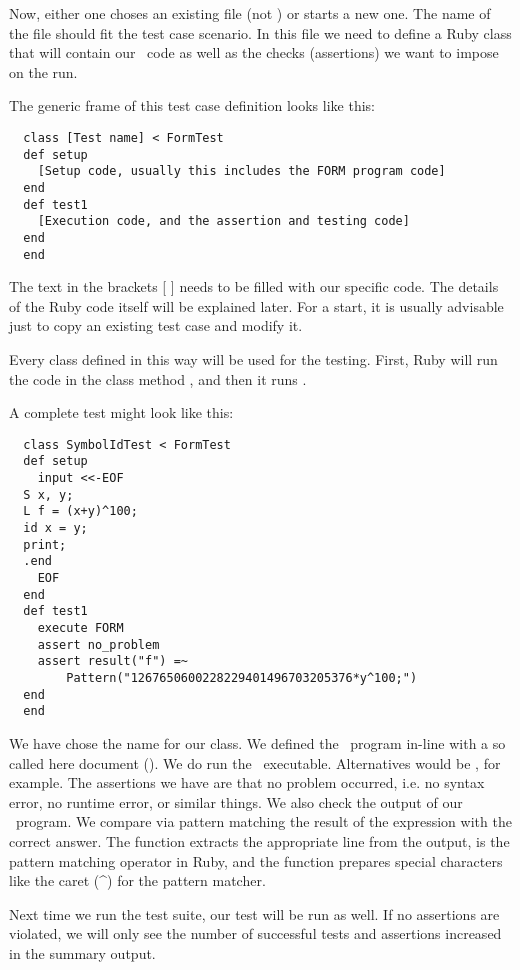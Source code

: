 Now, either one choses an existing  file (not ) or starts a
new one. The name of the file should fit the test case scenario. In this file we
need to define a Ruby class that will contain our \FORM\ code as well as the
checks (assertions) we want to impose on the run.

The generic frame of this test case definition looks like this:

\begin{verbatim}
  class [Test name] < FormTest
  def setup
    [Setup code, usually this includes the FORM program code]
  end
  def test1
    [Execution code, and the assertion and testing code]
  end
  end
\end{verbatim}

The text in the brackets [ ] needs to be filled with our specific code. The
details of the Ruby code itself will be explained later. For a start, it is
usually advisable just to copy an existing test case and modify it.

Every class defined in this way will be used for the testing. First, Ruby will
run the code in the class method , and then it runs .

A complete test might look like this:

\begin{verbatim}
  class SymbolIdTest < FormTest
  def setup
    input <<-EOF
  S x, y;
  L f = (x+y)^100;
  id x = y;
  print;
  .end
    EOF
  end
  def test1
    execute FORM
    assert no_problem
    assert result("f") =~ 
        Pattern("1267650600228229401496703205376*y^100;")
  end
  end
\end{verbatim}

We have chose the name  for our class. We defined the \FORM\
program in-line with a so called here document (). We do run
the \FORM\ executable. Alternatives would be \TFORM, for example. The assertions
we have are that no problem occurred, i.e. no syntax error, no runtime error, or
similar things. We also check the output of our \FORM\ program. We compare via
pattern matching the result of the expression \C{f} with the correct answer. The
function \C{result()} extracts the appropriate line from the output, \C{=\~{}} is
the pattern matching operator in Ruby, and the function \C{Pattern()} prepares
special characters like the caret (\^{}) for the pattern matcher.

Next time we run the test suite, our test will be run as well. If no assertions
are violated, we will only see the number of successful tests and assertions
increased in the summary output.

